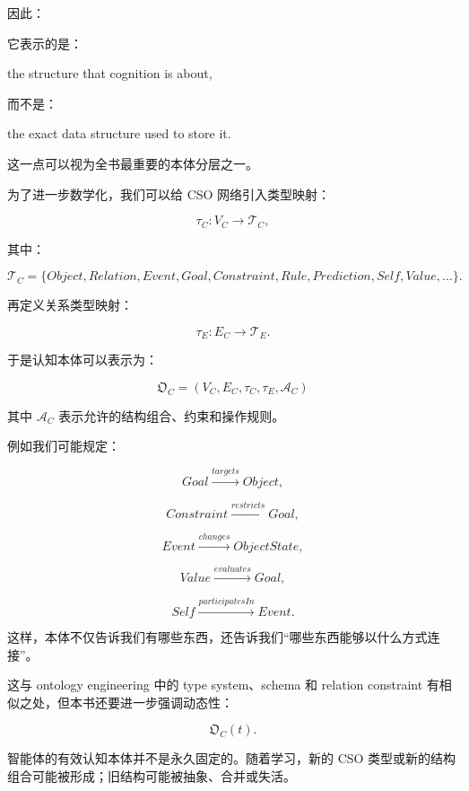 因此：

\begin{statementbox}
\centering
{}
\end{statementbox}

它表示的是：

\begin{statementbox}
the structure that cognition is about,
\end{statementbox}

而不是：

\begin{statementbox}
the exact data structure used to store it.
\end{statementbox}

这一点可以视为全书最重要的本体分层之一。

为了进一步数学化，我们可以给 CSO 网络引入类型映射：

\[
\tau_C:
V_C
\rightarrow
\mathcal T_C,
\]

其中：

\[
\mathcal T_C
=
\{
Object,
Relation,
Event,
Goal,
Constraint,
Rule,
Prediction,
Self,
Value,
\ldots
\}.
\]

再定义关系类型映射：

\[
\tau_E:
E_C
\rightarrow
\mathcal T_E.
\]

于是认知本体可以表示为：

\[
\boxed{
\mathfrak O_C
=
(
V_C,
E_C,
\tau_C,
\tau_E,
\mathcal A_C
)
}
\]

其中 \(\mathcal A_C\) 表示允许的结构组合、约束和操作规则。

例如我们可能规定：

\[
Goal
\xrightarrow{targets}
Object,
\]

\[
Constraint
\xrightarrow{restricts}
Goal,
\]

\[
Event
\xrightarrow{changes}
ObjectState,
\]

\[
Value
\xrightarrow{evaluates}
Goal,
\]

\[
Self
\xrightarrow{participatesIn}
Event.
\]

这样，本体不仅告诉我们有哪些东西，还告诉我们“哪些东西能够以什么方式连接”。

这与 ontology engineering 中的 type system、schema 和 relation constraint 有相似之处，但本书还要进一步强调动态性：

\[
\mathfrak O_C(t).
\]

智能体的有效认知本体并不是永久固定的。随着学习，新的 CSO 类型或新的结构组合可能被形成；旧结构可能被抽象、合并或失活。

